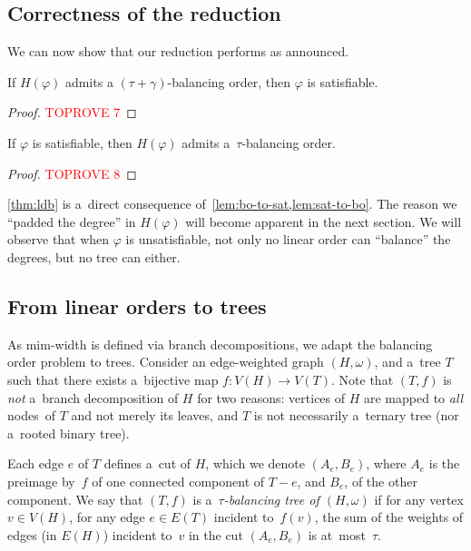 \documentclass[a4paper,UKenglish,cleveref,hyperref,autoref]{lipics-v2021}
\newcommand{\weight}{\omega}
\begin{document}
\subsection{Correctness of the reduction}

We can now show that our reduction performs as announced.

\begin{lemma}\label{lem:bo-to-sat}
If $H(\varphi)$ admits a $(\tau + \gamma)$-balancing order, then $\varphi$ is satisfiable.
\end{lemma}
\begin{proof}\textcolor{red}{TOPROVE 7}\end{proof}

\begin{lemma}\label{lem:sat-to-bo}
If $\varphi$ is satisfiable, then $H(\varphi)$ admits a~$\tau$-balancing order.
\end{lemma}
\begin{proof}\textcolor{red}{TOPROVE 8}\end{proof}

\cref{thm:ldb} is a~direct consequence of~\cref{lem:bo-to-sat,lem:sat-to-bo}.
The reason we ``padded the degree'' in $H(\varphi)$ will become apparent in the next section.
We will observe that when $\varphi$ is unsatisfiable, not only no linear order can ``balance'' the degrees, but no tree can either.

\subsection{From linear orders to trees}\label{sec:lin-ord-to-trees}

As mim-width is defined via branch decompositions, we adapt the balancing order problem to trees.
Consider an edge-weighted graph $(H, \weight)$, and a~tree $T$ such that there exists a~bijective map $f \colon V(H) \rightarrow V(T)$.
Note that $(T, f)$ is \emph{not} a~branch decomposition of $H$ for two reasons: vertices of $H$ are mapped to \emph{all} nodes~of $T$ and not merely its leaves, and $T$ is not necessarily a~ternary tree (nor a~rooted binary tree).

Each edge $e$ of $T$ defines a~cut of $H$, which we denote $(A_e, B_e)$, where $A_e$ is the preimage by~$f$ of one connected component of $T-e$, and $B_e$, of the other component.
We say that $(T, f)$ is a~\emph{$\tau$-balancing tree of $(H, \weight)$} if for any vertex $v \in V(H)$, for any edge $e \in E(T)$ incident to~$f(v)$, the sum of the weights of edges (in $E(H)$) incident to~$v$ in the cut $(A_e, B_e)$ is at~most~$\tau$.
\end{document}
